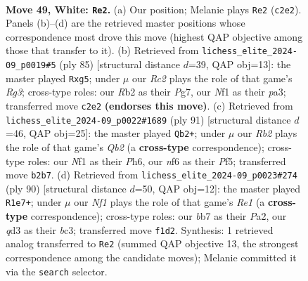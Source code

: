 \documentclass[11pt]{article}
\begin{document}
\clearpage

\begin{figure}[p]\centering
\begin{subfigure}{0.46\textwidth}\centering
\resizebox{\linewidth}{!}{%
\newchessgame
\chessboard[
  setfen={6k1/1b3p2/5np1/8/7P/3q4/1RR4P/5NK1 w - - 5 49},
  showmover=false,
  pgfstyle=straightmove, color=movearrow, markmove={c2-e2}
]}
\caption{}
\end{subfigure}\hfill
\begin{subfigure}{0.46\textwidth}\centering
\resizebox{\linewidth}{!}{%
\newchessgame
\chessboard[
  setfen={8/5kp1/p5r1/6Q1/5K2/P4P1P/6P1/8 b - - 2 43},
  showmover=false,
  pgfstyle=straightmove, color=movearrow, markmove={g6-g5}
]}
\caption{}
\end{subfigure}
\\[4pt]
\begin{subfigure}{0.46\textwidth}\centering
\resizebox{\linewidth}{!}{%
\newchessgame
\chessboard[
  setfen={7k/1q2r1p1/3Q3p/5p2/7P/4P3/5K1P/2R5 b - - 2 46},
  showmover=false,
  pgfstyle=straightmove, color=movearrow, markmove={b7-b2}
]}
\caption{}
\end{subfigure}\hfill
\begin{subfigure}{0.46\textwidth}\centering
\resizebox{\linewidth}{!}{%
\newchessgame
\chessboard[
  setfen={4R3/7k/p5q1/7p/2p5/2b4P/P4P2/4RK2 w - - 2 46},
  showmover=false,
  pgfstyle=straightmove, color=movearrow, markmove={e1-e7}
]}
\caption{}
\end{subfigure}
\caption{\textbf{Move 49, White: \texttt{Re2}.} (a) Our position; Melanie plays \texttt{Re2} (\texttt{c2e2}). Panels (b)--(d) are the retrieved master positions whose correspondence most drove this move (highest QAP objective among those that transfer to it). (b) Retrieved from \texttt{lichess\_elite\_2024-09\_p0019\#5} (ply 85) [structural distance $d$=39, QAP obj=13]: the master played \texttt{Rxg5}; under $\mu$ our \emph{Rc2} plays the role of that game's \emph{Rg3}; cross-type roles: our \emph{R}b2 as their \emph{P}g7, our \emph{N}f1 as their \emph{p}a3; transferred move \texttt{c2e2} \textbf{(endorses this move)}. (c) Retrieved from \texttt{lichess\_elite\_2024-09\_p0022\#1689} (ply 91) [structural distance $d$=46, QAP obj=25]: the master played \texttt{Qb2+}; under $\mu$ our \emph{Rb2} plays the role of that game's \emph{Qb2} (a \textbf{cross-type} correspondence); cross-type roles: our \emph{N}f1 as their \emph{P}h6, our \emph{n}f6 as their \emph{P}f5; transferred move \texttt{b2b7}. (d) Retrieved from \texttt{lichess\_elite\_2024-09\_p0023\#274} (ply 90) [structural distance $d$=50, QAP obj=12]: the master played \texttt{R1e7+}; under $\mu$ our \emph{Nf1} plays the role of that game's \emph{Re1} (a \textbf{cross-type} correspondence); cross-type roles: our \emph{b}b7 as their \emph{P}a2, our \emph{q}d3 as their \emph{b}c3; transferred move \texttt{f1d2}. Synthesis: 1 retrieved analog transferred to \texttt{Re2} (summed QAP objective 13, the strongest correspondence among the candidate moves); Melanie committed it via the \texttt{search} selector.}
\label{fig:thought-m96}
\end{figure}
\end{document}
